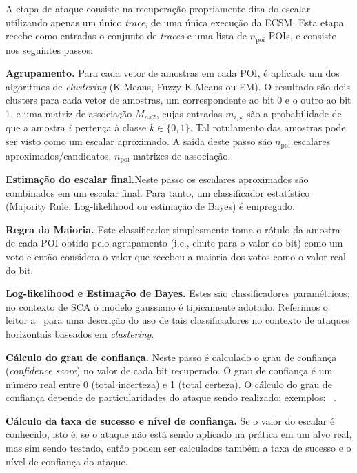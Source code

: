 \documentclass{SBCbookchapter}
\begin{document}
A etapa de ataque consiste na recuperação propriamente dita do escalar utilizando apenas um único \emph{trace}, 
de uma única execução da ECSM. Esta etapa recebe como entradas o conjunto de \emph{traces} e uma lista de $n_{\mathrm{poi}}$ POIs, e consiste nos seguintes passos:
\begin{description}
\item \textbf{Agrupamento.} Para cada vetor de amostras em cada POI, é aplicado um dos algoritmos de \emph{clustering} (K-Means, Fuzzy K-Means ou EM). O resultado são dois clusters para cada vetor de amostras, um correspondente ao bit 0 e o outro ao bit 1, e uma matriz de associação $M_{nx2}$, cujas entradas $m_{i,k}$ são a probabilidade de que a amostra $i$ pertença à classe $k\in \{0,1\}$. Tal rotulamento das amostras pode ser visto como um escalar aproximado. A saída deste passo são $n_{\mathrm{poi}}$ escalares aproximados/candidatos, $n_{\mathrm{poi}}$ matrizes de associação.
	
\item \textbf{Estimação do escalar final.}Neste passo os escalares aproximados são combinados em um escalar final. Para tanto, um classificador estatístico (Majority Rule, Log-likelihood ou estimação de Bayes) é empregado.

\textbf{Regra da Maioria.} Este classificador simplesmente toma o rótulo da amostra de cada POI obtido pelo agrupamento (i.e., chute para o valor do bit) como um voto e então considera o valor que recebeu a maioria dos votos como o valor real do bit.

\textbf{Log-likelihood e Estimação de Bayes.} Estes são classificadores paramétricos; no contexto de SCA o modelo gaussiano é tipicamente adotado. Referimos o leitor a~\cite{Perin2014,PerinChmielewski2015} para uma descrição do uso de tais classificadores no contexto de ataques horizontais baseados em \emph{clustering}.
	
\item \textbf{Cálculo do grau de confiança.} Neste passo é calculado o grau de confiança (\emph{confidence score}) no valor de cada bit recuperado. O grau de confiança é um número real entre 0 (total incerteza) e 1 (total certeza). O cálculo do grau de confiança depende de particularidades do ataque sendo realizado; exemplos: ~\cite{Nascimento2016_SAC,PerinChmielewski2015}.
	
\item \textbf{Cálculo da taxa de sucesso e nível de confiança.}
Se o valor do escalar é conhecido, isto é, se o ataque não está sendo aplicado na prática em um alvo real, mas sim sendo testado, então podem ser calculados também a taxa de sucesso e o nível de confiança do ataque. 


\end{description}
\end{document}
